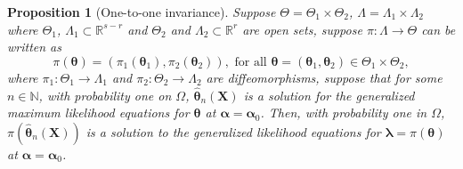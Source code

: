 \documentclass[10pt,a4paper,onecolumn]{article} %
\newtheorem{proposition}[theorem]{Proposition}
\newcommand{\bs}{\boldsymbol}
\begin{document}
\begin{proposition}[One-to-one invariance] Suppose $\Theta=\Theta_1\times \Theta_2$, $\Lambda=\Lambda_1\times \Lambda_2$ where  $\Theta_1$, $\Lambda_1\subset \mathbb{R}^{s-r}$ and $\Theta_2$ and $\Lambda_2\subset \mathbb{R}^r$ are open sets, suppose $\pi:\Lambda\to \Theta$ can be written as
 \begin{equation*}\pi(\bs{\theta})=(\pi_1(\bs{\theta}_1),\pi_2(\bs{\theta}_2)),\mbox{ for all }\bs{\theta}=(\bs{\theta}_1,\bs{\theta}_2)\in \Theta_1\times \Theta_2,
 \end{equation*}
where $\pi_1:\Theta_1\to \Lambda_1$ and $\pi_2:\Theta_2\to \Lambda_2$ are diffeomorphisms, suppose that for some $n\in \mathbb{N}$, with probability one on $\Omega$, $\bs{\hat{\theta}}_n(\bs{X})$ is a solution for the generalized maximum likelihood equations for $\bs{\theta}$ at $\bs{\alpha}=\bs{\alpha}_0$. Then, with probability one in $\Omega$, $\pi (\bs{\hat{\theta}}_n(\bs{X}))$ is a solution to the generalized likelihood equations for $\bs{\lambda}=\pi(\bs{\theta})$ at $\bs{\alpha}=\bs{\alpha}_0$.
\end{proposition}
\end{document}
